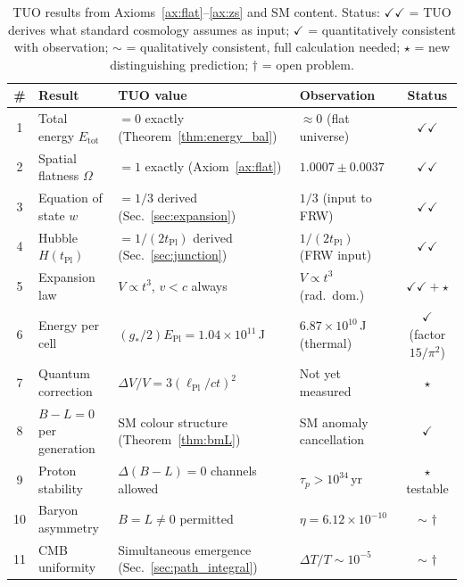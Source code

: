 \documentclass[12pt,a4paper]{article}
\theoremstyle{definition}
\theoremstyle{remark}
\newcommand{\EPl}{E_{\mathrm{Pl}}}
\newcommand{\tPl}{t_{\mathrm{Pl}}}
\newcommand{\lPl}{\ell_{\mathrm{Pl}}}
\newcommand{\gstar}{g_{*}}
\begin{document}
\begin{table}[ht]
\centering
\caption{TUO results from Axioms~\ref{ax:flat}--\ref{ax:zs} and SM content.
Status: $\checkmark\checkmark$ = TUO derives what standard cosmology assumes
as input; $\checkmark$ = quantitatively consistent with observation;
$\sim$ = qualitatively consistent, full calculation needed;
$\star$ = new distinguishing prediction; $\dagger$ = open problem.}
\label{tab:predictions}
\begin{tabular}{cp{3.2cm}p{4.2cm}p{3.0cm}c}
\toprule
\# & Result & TUO value & Observation & Status \\
\midrule
1 & Total energy $E_\mathrm{tot}$ & $= 0$ exactly (Theorem~\ref{thm:energy_bal}) &
  $\approx 0$ (flat universe) & $\checkmark\checkmark$ \\
2 & Spatial flatness $\Omega$ & $= 1$ exactly (Axiom~\ref{ax:flat}) &
  $1.0007\pm0.0037$~\cite{Planck2018} & $\checkmark\checkmark$ \\
3 & Equation of state $w$ & $= 1/3$ derived (Sec.~\ref{sec:expansion}) &
  $1/3$ (input to FRW) & $\checkmark\checkmark$ \\
4 & Hubble $H(\tPl)$ & $= 1/(2\tPl)$ derived (Sec.~\ref{sec:junction}) &
  $1/(2\tPl)$ (FRW input) & $\checkmark\checkmark$ \\
5 & Expansion law & $V \propto t^3$, $v < c$ always &
  $V \propto t^3$ (rad.\ dom.) & $\checkmark\checkmark + \star$ \\
6 & Energy per cell & $(\gstar/2)\EPl = 1.04\times10^{11}$\,J &
  $6.87\times10^{10}$\,J (thermal) & $\checkmark$ (factor $15/\pi^2$) \\
7 & Quantum correction & $\Delta V/V = 3(\lPl/ct)^2$ &
  Not yet measured & $\star$ \\
8 & $B-L = 0$ per generation & SM colour structure (Theorem~\ref{thm:bmL}) &
  SM anomaly cancellation & $\checkmark$ \\
9 & Proton stability & $\Delta(B-L)=0$ channels allowed &
  $\tau_p > 10^{34}$\,yr~\cite{SuperK2020} & $\star$ testable \\
10 & Baryon asymmetry & $B = L \neq 0$ permitted &
  $\eta = 6.12\times10^{-10}$ & $\sim$ $\dagger$ \\
11 & CMB uniformity & Simultaneous emergence (Sec.~\ref{sec:path_integral}) &
  $\Delta T/T \sim 10^{-5}$ & $\sim$ $\dagger$ \\
\bottomrule
\end{tabular}
\end{table}

\end{document}
